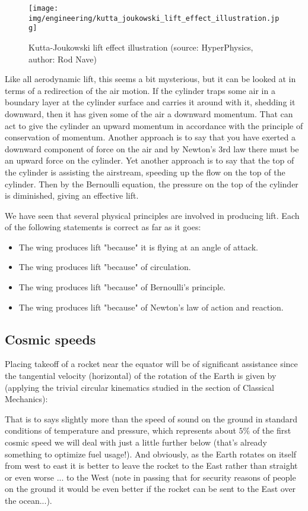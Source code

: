 	\begin{figure}[H]
		\centering
		\texttt{[image: img/engineering/kutta\_joukowski\_lift\_effect\_illustration.jpg]}
		\caption[Kutta-Joukowski lift effect illustration]{Kutta-Joukowski lift effect illustration (source: HyperPhysics, author: Rod Nave)}
	\end{figure}
	Like all aerodynamic lift, this seems a bit mysterious, but it can be looked at in terms of a redirection of the air motion. If the cylinder traps some air in a boundary layer at the cylinder surface and carries it around with it, shedding it downward, then it has given some of the air a downward momentum. That can act to give the cylinder an upward momentum in accordance with the principle of conservation of momentum. Another approach is to say that you have exerted a downward component of force on the air and by Newton's 3rd law there must be an upward force on the cylinder. Yet another approach is to say that the top of the cylinder is assisting the airstream, speeding up the flow on the top of the cylinder. Then by the Bernoulli equation, the pressure on the top of the cylinder is diminished, giving an effective lift.
	
	We have seen that several physical principles are involved in producing lift. Each of the following statements is correct as far as it goes:
	\begin{itemize}
		\item The wing produces lift "because" it is flying at an angle of attack.
		\item The wing produces lift "because" of circulation.
		\item The wing produces lift "because" of Bernoulli's principle.
		\item The wing produces lift "because" of Newton's law of action and reaction.
	\end{itemize}

	\pagebreak
	\subsection{Cosmic speeds}
	Placing takeoff of a rocket near the equator will be of significant assistance since the tangential velocity (horizontal) of the rotation of the Earth is given by (applying the trivial circular kinematics studied in the section of Classical Mechanics):
	
	That is to says slightly more than the speed of sound on the ground in standard conditions of temperature and pressure, which represents about $5\%$ of the first cosmic speed we will deal with just a little further below (that's already something to optimize fuel usage!). And obviously, as the Earth rotates on itself from west to east it is better to leave the rocket to the East rather than straight or even worse ... to the West (note in passing that for security reasons of people on the ground it would be even better if the rocket can be sent to the East over the ocean...).
	
